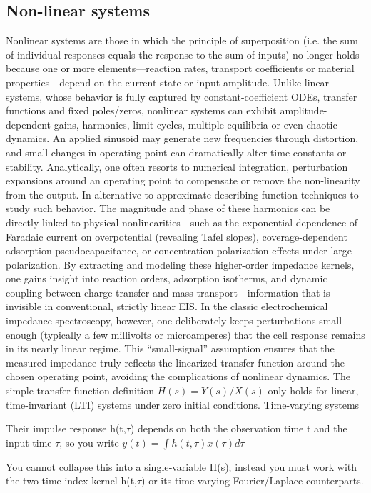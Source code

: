 \subsection{Non-linear systems}
Nonlinear systems are those in which the principle of superposition (i.e. the sum of individual responses equals the response to the sum of inputs) no longer holds because one or more elements—reaction rates, transport coefficients or material properties—depend on the current state or input amplitude. Unlike linear systems, whose behavior is fully captured by constant-coefficient ODEs, transfer functions and fixed poles/zeros, nonlinear systems can exhibit amplitude-dependent gains, harmonics, limit cycles, multiple equilibria or even chaotic dynamics. An applied sinusoid may generate new frequencies through distortion, and small changes in operating point can dramatically alter time-constants or stability. Analytically, one often resorts to numerical integration, perturbation expansions around an operating point to compensate or remove the non-linearity from the output. In alternative to approximate describing-function techniques to study such behavior. The magnitude and phase of these harmonics can be directly linked to physical nonlinearities—such as the exponential dependence of Faradaic current on overpotential (revealing Tafel slopes), coverage-dependent adsorption pseudocapacitance, or concentration-polarization effects under large polarization. By extracting and modeling these higher-order impedance kernels, one gains insight into reaction orders, adsorption isotherms, and dynamic coupling between charge transfer and mass transport—information that is invisible in conventional, strictly linear EIS. 
In the classic electrochemical impedance spectroscopy, however, one deliberately keeps perturbations small enough (typically a few millivolts or microamperes) that the cell response remains in its nearly linear regime. This “small-signal” assumption ensures that the measured impedance truly reflects the linearized transfer function around the chosen operating point, avoiding the complications of nonlinear dynamics. 
The simple transfer-function definition $H(s)=Y(s)/X(s)$ only holds for linear, time-invariant (LTI) systems under zero initial conditions.
Time-varying systems

Their impulse response h(t,$\tau$) depends on both the observation time t and the input time $\tau$, so you write
$y(t)=\int h(t,\tau)x(\tau)d\tau$

You cannot collapse this into a single‐variable H(s); instead you must work with the two-time‐index kernel h(t,$\tau$) or its time-varying Fourier/Laplace counterparts.

